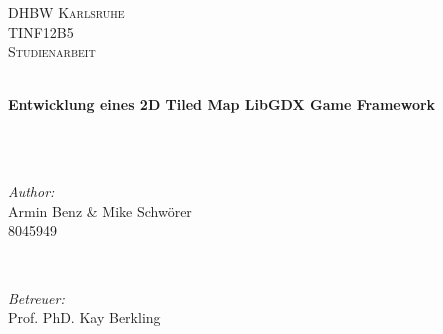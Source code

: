 \begin{titlepage}

\center %
 

\textsc{\LARGE DHBW Karlsruhe}\\[1.5cm] %
\textsc{\Large TINF12B5}\\[0.5cm] %
\textsc{\large Studienarbeit}\\[0.5cm] %


\HRule \\[0.4cm]
{ 
\begin{singlespace}
\huge \bfseries 
Entwicklung eines 2D Tiled Map LibGDX Game Framework
\end{singlespace}
} ~\\[0.4cm] %
\HRule \\[1.5cm]
 

\begin{minipage}{0.4\textwidth}
\begin{flushleft} \large
\emph{Author:}\\
Armin Benz \& Mike Schwörer\\ %
\textsc{8045949} %
\end{flushleft}
\end{minipage}
~
\begin{minipage}{0.4\textwidth}
\begin{flushright} \large
\emph{Betreuer:} \\
Prof. PhD. Kay Berkling \\%
\strut
\end{flushright}
\end{minipage}\\[3cm]


\end{titlepage}
